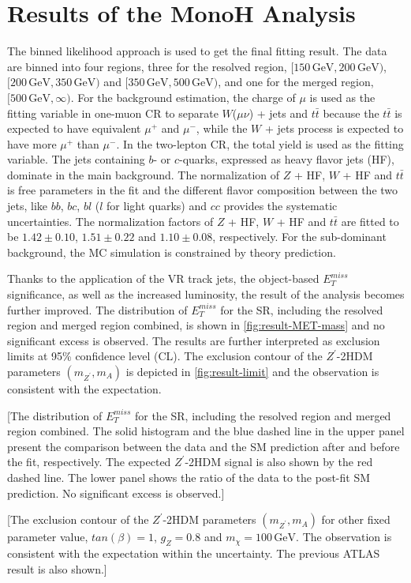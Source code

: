 \documentclass[class=NTHU_thesis, crop=false]{standalone}
\begin{document}
\section{Results of the MonoH Analysis}
The binned likelihood approach is used to get the final fitting result. The data are binned into four regions, three for the resolved region, $[150\, \mathrm{GeV}, 200\, \mathrm{GeV})$, $[200\, \mathrm{GeV}, 350\, \mathrm{GeV})$ and $[350\, \mathrm{GeV}, 500\, \mathrm{GeV})$, and one for the merged region, $[500\, \mathrm{GeV}, \infty)$. For the background estimation, the charge of $\mu$ is used as the fitting variable in one-muon CR to separate $W$($\mu\nu$) + jets and $t\bar{t}$ because the $t\bar{t}$ is expected to have equivalent $\mu^+$ and $\mu^-$, while the $W$ + jets process is expected to have more $\mu^+$ than $\mu^-$. In the two-lepton CR, the total yield is used as the fitting variable. The jets containing $b$- or $c$-quarks, expressed as heavy flavor jets (HF), dominate in the main background. The normalization of $Z$ + HF, $W$ + HF and $t\bar{t}$ is free parameters in the fit and the different flavor composition between the two jets, like $bb$, $bc$, $bl$ ($l$ for light quarks) and $cc$ provides the systematic uncertainties. The normalization factors of $Z$ + HF, $W$ + HF and $t\bar{t}$ are fitted to be $1.42 \pm 0.10$, $1.51 \pm 0.22$ and $1.10 \pm 0.08$, respectively. For the sub-dominant background, the MC simulation is constrained by theory prediction.

Thanks to the application of the VR track jets, the object-based $E^{miss}_T$ significance, as well as the increased luminosity, the result of the analysis becomes further improved. The distribution of $E^{miss}_T$ for the SR, including the resolved region and merged region combined, is shown in \cref{fig:result-MET-mass} and no significant excess is observed. The results are further interpreted as exclusion limits at 95\% confidence level (CL). The exclusion contour of the $Z^\prime$-2HDM parameters $(m_{Z^\prime}, m_A)$ is depicted in \cref{fig:result-limit} and the observation is consistent with the expectation.

[The distribution of $E^{miss}_T$ for the SR, including the resolved region and merged region combined. The solid histogram and the blue dashed line in the upper panel present the comparison between the data and the SM prediction after and before the fit, respectively. The expected $Z^\prime$-2HDM signal is also shown by the red dashed line. The lower panel shows the ratio of the data to the post-fit SM prediction. No significant excess is observed.]

[The exclusion contour of the $Z^\prime$-2HDM parameters $(m_{Z^\prime}, m_A)$ for other fixed parameter value, $tan(\beta) = 1$, $g_Z = 0.8$ and $m_\chi = 100\, \mathrm{GeV}$. The observation is consistent with the expectation within the uncertainty. The previous ATLAS result is also shown.]
\end{document}
